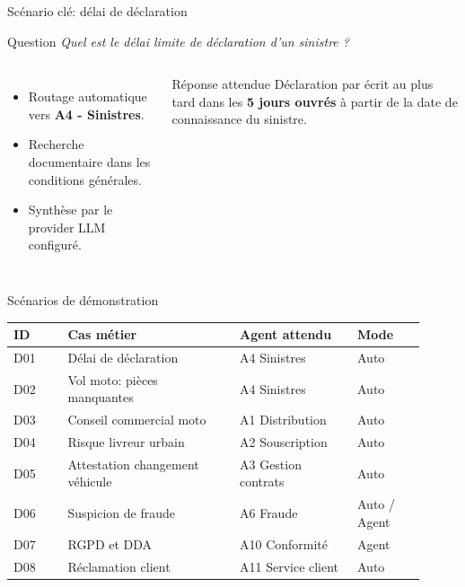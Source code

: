 \documentclass[aspectratio=169]{beamer}
\begin{document}
\begin{frame}{Scénario clé: délai de déclaration}
  \begin{block}{Question}
    \textit{Quel est le délai limite de déclaration d'un sinistre ?}
  \end{block}

  \begin{columns}[T]
      \begin{itemize}
        \item Routage automatique vers \textbf{A4 - Sinistres}.
        \item Recherche documentaire dans les conditions générales.
        \item Synthèse par le provider LLM configuré.
      \end{itemize}
      \begin{exampleblock}{Réponse attendue}
        Déclaration par écrit au plus tard dans les \textbf{5 jours ouvrés} à partir de la date de connaissance du sinistre.
      \end{exampleblock}
  \end{columns}
\end{frame}

\begin{frame}{Scénarios de démonstration}
  \scriptsize
  \begin{tabular}{@{}p{0.12\linewidth}p{0.38\linewidth}p{0.26\linewidth}p{0.15\linewidth}@{}}
    \toprule
    \textbf{ID} & \textbf{Cas métier} & \textbf{Agent attendu} & \textbf{Mode} \\
    \midrule
    D01 & Délai de déclaration & A4 Sinistres & Auto \\
    D02 & Vol moto: pièces manquantes & A4 Sinistres & Auto \\
    D03 & Conseil commercial moto & A1 Distribution & Auto \\
    D04 & Risque livreur urbain & A2 Souscription & Auto \\
    D05 & Attestation changement véhicule & A3 Gestion contrats & Auto \\
    D06 & Suspicion de fraude & A6 Fraude & Auto / Agent \\
    D07 & RGPD et DDA & A10 Conformité & Agent \\
    D08 & Réclamation client & A11 Service client & Auto \\
    \bottomrule
  \end{tabular}
\end{frame}
\end{document}
